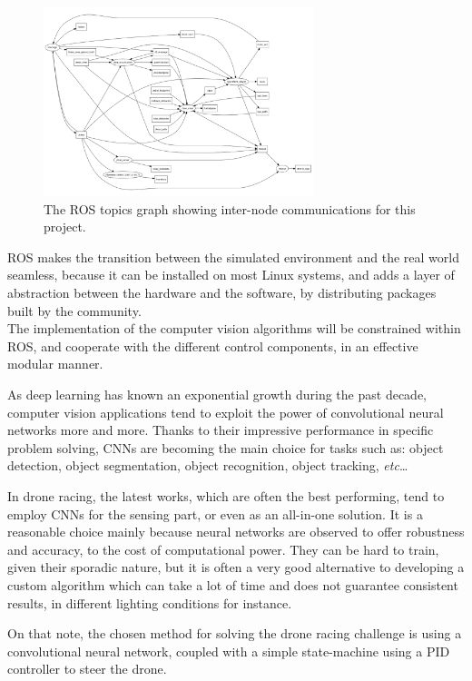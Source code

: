 \begin{figure}[h]
	\centering
	\includegraphics[width=0.7\textwidth]{figure/ros_topics.png}
	\caption{The ROS topics graph showing inter-node communications for this
	project.}
	\label{fig:ros-topics}
\end{figure}

ROS makes the transition between the simulated environment and the real world
seamless, because it can be installed on most Linux systems, and adds a layer
of abstraction between the hardware and the software, by distributing packages
built by the community.\\

The implementation of the computer vision algorithms will be constrained within
ROS, and cooperate with the different control components, in an effective
modular manner.\\



As deep learning has known an exponential growth during the past decade,
computer vision applications tend to exploit the power of convolutional neural
networks more and more. Thanks to their impressive performance in specific
problem solving, CNNs are becoming the main choice for tasks such as: object
detection, object segmentation, object recognition, object tracking,
\emph{etc}\ldots

In drone racing, the latest works, which are often the best performing, tend to
employ CNNs for the sensing part, or even as an all-in-one solution. It is a
reasonable choice mainly because neural networks are observed to offer
robustness and accuracy, to the cost of computational power. They can be hard
to train, given their sporadic nature, but it is often a very good alternative
to developing a custom algorithm which can take a lot of time and does not
guarantee consistent results, in different lighting conditions for instance.

On that note, the chosen method for solving the drone racing challenge is
using a convolutional neural network, coupled with a simple state-machine 
using a PID controller to steer the drone.
